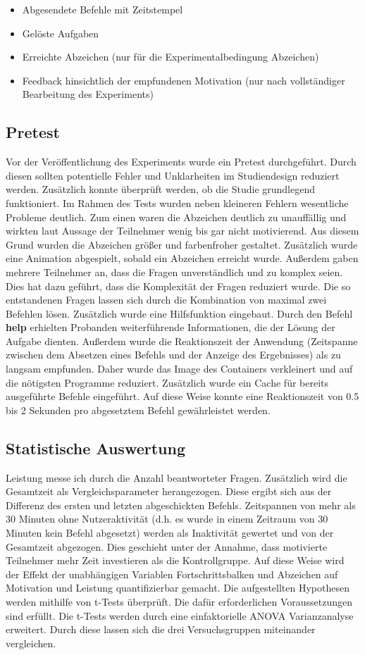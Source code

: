 \begin{itemize}
	 \item Abgesendete Befehle mit Zeitstempel
	 \item Gelöste Aufgaben 
	 \item Erreichte Abzeichen (nur für die Experimentalbedingung Abzeichen)
	 \item Feedback hinsichtlich der empfundenen Motivation (nur nach vollständiger Bearbeitung des Experiments)
\end{itemize}


\subsection{Pretest}\label{verlauf}
Vor der Veröffentlichung des Experiments wurde ein Pretest durchgeführt. Durch diesen sollten potentielle Fehler und Unklarheiten im Studiendesign reduziert werden. Zusätzlich konnte überprüft werden, ob die Studie grundlegend funktioniert. Im Rahmen des Tests wurden neben kleineren Fehlern wesentliche Probleme deutlich. Zum einen waren die Abzeichen deutlich zu unauffällig und wirkten laut Aussage der Teilnehmer wenig bis gar nicht motivierend. Aus diesem Grund wurden die Abzeichen größer und farbenfroher gestaltet. Zusätzlich wurde eine Animation abgespielt, sobald ein Abzeichen erreicht wurde. Außerdem gaben mehrere Teilnehmer an, dass die Fragen unverständlich und zu komplex seien. Dies hat dazu geführt, dass die Komplexität der Fragen reduziert wurde. Die so entstandenen Fragen lassen sich durch die Kombination von maximal zwei Befehlen lösen. Zusätzlich wurde eine Hilfsfunktion eingebaut. Durch den Befehl \textbf{help} erhielten Probanden weiterführende Informationen, die der Lösung der Aufgabe dienten. Außerdem wurde die Reaktionszeit der Anwendung (Zeitspanne zwischen dem Absetzen eines Befehls und der Anzeige des Ergebnisses) als zu langsam empfunden. Daher wurde das Image des Containers verkleinert und auf die nötigsten Programme reduziert. Zusätzlich wurde ein Cache für bereits ausgeführte Befehle eingeführt. Auf diese Weise konnte eine Reaktionszeit von 0.5 bis 2 Sekunden pro abgesetztem Befehl gewährleistet werden.


\subsection{Statistische Auswertung}
Leistung messe ich durch die Anzahl beantworteter Fragen. Zusätzlich wird die Gesamtzeit als Vergleichsparameter herangezogen. Diese ergibt sich aus der Differenz des ersten und letzten abgeschickten Befehls. Zeitspannen von mehr als 30 Minuten ohne Nutzeraktivität (d.h. es wurde in einem Zeitraum von 30 Minuten kein Befehl abgesetzt) werden als Inaktivität gewertet und von der Gesamtzeit abgezogen. Dies geschieht unter der Annahme, dass motivierte Teilnehmer mehr Zeit investieren als die Kontrollgruppe. Auf diese Weise wird der Effekt der unabhängigen Variablen Fortschrittsbalken und Abzeichen auf Motivation und Leistung quantifizierbar gemacht. Die aufgestellten Hypothesen werden mithilfe von t-Tests überprüft. Die dafür erforderlichen Voraussetzungen sind erfüllt. Die t-Tests werden durch eine einfaktorielle ANOVA Varianzanalyse erweitert. Durch diese lassen sich die drei Versuchsgruppen miteinander vergleichen.
